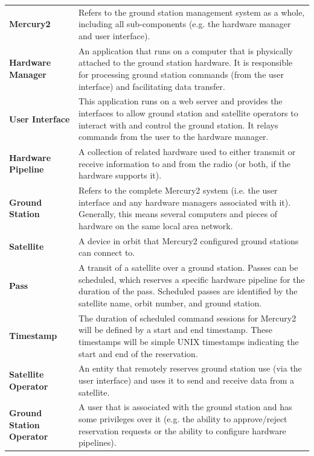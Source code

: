 \documentclass{mxl-design}
\begin{document}
\begin{table}[h]
	\footnotesize {\begin{tabular}{ p{5cm} p{10cm} }
		\textbf{Mercury2} & Refers to the ground station management system as a whole, including all sub-components (e.g. the hardware manager and user interface).\\[.2cm]
		\textbf{Hardware Manager} & An application that runs on a computer that is physically attached to the ground station hardware. It is responsible for processing ground station commands (from the user interface) and facilitating data transfer.\\[.2cm]
		\textbf{User Interface} & This application runs on a web server and provides the interfaces to allow ground station and satellite operators to interact with and control the ground station. It relays commands from the user to the hardware manager.\\[.2cm]
		\textbf{Hardware Pipeline} & A collection of related hardware used to either transmit or receive information to and from the radio (or both, if the hardware supports it).\\[.2cm]
		\textbf{Ground Station} & Refers to the complete Mercury2 system (i.e. the user interface and any hardware managers associated with it). Generally, this means several computers and pieces of hardware on the same local area network.\\[.2cm]
		\textbf{Satellite} & A device in orbit that Mercury2 configured ground stations can connect to.\\[.2cm]
		\textbf{Pass} & A transit of a satellite over a ground station. Passes can be scheduled, which reserves a specific hardware pipeline for the duration of the pass. Scheduled passes are identified by the satellite name, orbit number, and ground station.\\[.2cm]
		\textbf{Timestamp} & The duration of scheduled command sessions for Mercury2 will be defined by a start and end timestamp. These timestamps will be simple UNIX timestamps indicating the start and end of the reservation.\\[.2cm]
		\textbf{Satellite Operator} & An entity that remotely reserves ground station use (via the user interface) and uses it to send and receive data from a satellite.\\[.2cm]
		\textbf{Ground Station Operator} & A user that is associated with the ground station and has some privileges over it (e.g. the ability to approve/reject reservation requests or the ability to configure hardware pipelines).\\[.2cm]

\end{tabular}}
\end{table}
\end{document}
